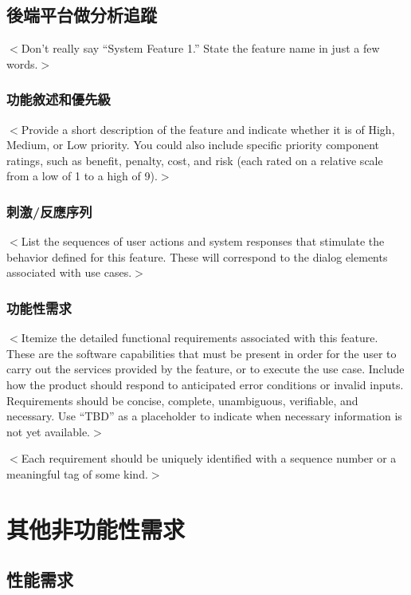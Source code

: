 \documentclass[12pt]{scrreprt}
\begin{document}
\section{後端平台做分析追蹤}
$<$Don’t really say “System Feature 1.” State the feature name in just a few 
words.$>$

\subsection{功能敘述和優先級}
$<$Provide a short description of the feature and indicate whether it is of 
High, Medium, or Low priority. You could also include specific priority 
component ratings, such as benefit, penalty, cost, and risk (each rated on a 
relative scale from a low of 1 to a high of 9).$>$

\subsection{刺激/反應序列}
$<$List the sequences of user actions and system responses that stimulate the 
behavior defined for this feature. These will correspond to the dialog elements 
associated with use cases.$>$

\subsection{功能性需求}
$<$Itemize the detailed functional requirements associated with this feature.  
These are the software capabilities that must be present in order for the user 
to carry out the services provided by the feature, or to execute the use case.  
Include how the product should respond to anticipated error conditions or 
invalid inputs. Requirements should be concise, complete, unambiguous, 
verifiable, and necessary. Use “TBD” as a placeholder to indicate when necessary 
information is not yet available.$>$

$<$Each requirement should be uniquely identified with a sequence number or a 
meaningful tag of some kind.$>$


\chapter{其他非功能性需求}

\section{性能需求}
\end{document}
